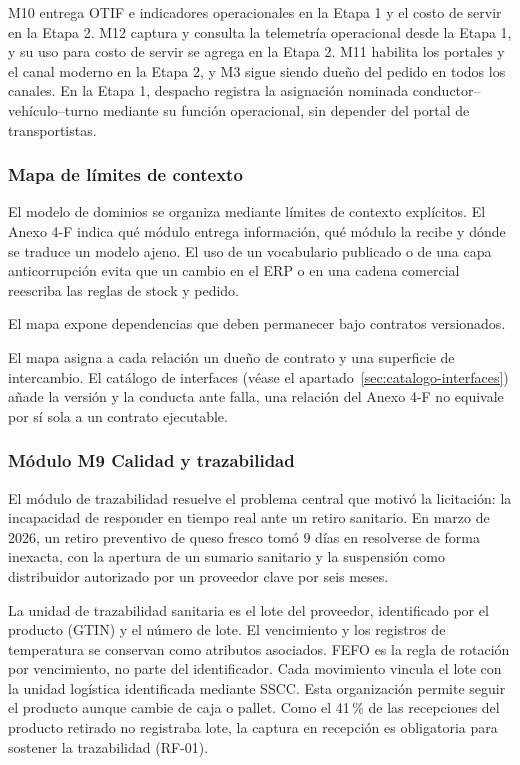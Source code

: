M10 entrega OTIF e indicadores operacionales en la Etapa 1 y el costo de servir en la Etapa 2. M12 captura y consulta la telemetría operacional desde la Etapa 1, y su uso para costo de servir se agrega en la Etapa 2. M11 habilita los portales y el canal moderno en la Etapa 2, y M3 sigue siendo dueño del pedido en todos los canales. En la Etapa 1, despacho registra la asignación nominada conductor--vehículo--turno mediante su función operacional, sin depender del portal de transportistas.

\subsubsection{Mapa de límites de contexto}
\label{subsec:limites-contexto}

El modelo de dominios se organiza mediante límites de contexto explícitos. El Anexo 4-F indica qué módulo entrega información, qué módulo la recibe y dónde se traduce un modelo ajeno. El uso de un vocabulario publicado o de una capa anticorrupción evita que un cambio en el ERP o en una cadena comercial reescriba las reglas de stock y pedido.


El mapa expone dependencias que deben permanecer bajo contratos versionados.

El mapa asigna a cada relación un dueño de contrato y una superficie de intercambio. El catálogo de interfaces (véase el apartado~\ref{sec:catalogo-interfaces}) añade la versión y la conducta ante falla, una relación del Anexo 4-F no equivale por sí sola a un contrato ejecutable.

\subsubsection{Módulo M9 Calidad y trazabilidad}
\label{subsec:modulo-m9}

El módulo de trazabilidad resuelve el problema central que motivó la licitación: la incapacidad de responder en tiempo real ante un retiro sanitario. En marzo de 2026, un retiro preventivo de queso fresco tomó 9 días en resolverse de forma inexacta, con la apertura de un sumario sanitario y la suspensión como distribuidor autorizado por un proveedor clave por seis meses.

La unidad de trazabilidad sanitaria es el lote del proveedor, identificado por el producto (GTIN) y el número de lote. El vencimiento y los registros de temperatura se conservan como atributos asociados. FEFO es la regla de rotación por vencimiento, no parte del identificador. Cada movimiento vincula el lote con la unidad logística identificada mediante SSCC. Esta organización permite seguir el producto aunque cambie de caja o pallet. Como el 41\,\% de las recepciones del producto retirado no registraba lote, la captura en recepción es obligatoria para sostener la trazabilidad (RF-01).

